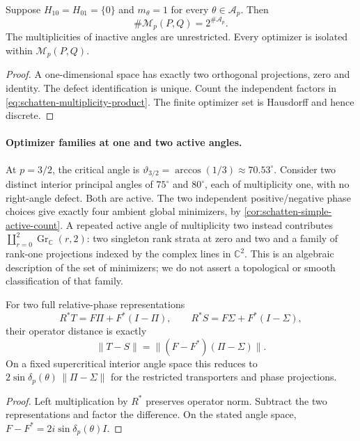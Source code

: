 \begin{corollary}
\label{cor:schatten-simple-active-count}
Suppose $H_{10}=H_{01}=\{0\}$ and $m_\theta=1$ for every
$\theta\in\mathcal A_p$. Then
\[
 \#\mathcal M_p(P,Q)=2^{\#\mathcal A_p}.
\]
The multiplicities of inactive angles are unrestricted.
Every optimizer is isolated within $\mathcal M_p(P,Q)$.
\end{corollary}

\begin{proof}
A one-dimensional space has exactly two orthogonal projections, zero and
identity. The defect identification is unique. Count the independent
factors in \cref{eq:schatten-multiplicity-product}.
The finite optimizer set is Hausdorff and hence discrete.
\end{proof}

\paragraph{Optimizer families at one and two active angles.}
At $p=3/2$, the critical angle is
$\vartheta_{3/2}=\arccos(1/3)\approx70.53^\circ$.
Consider two distinct interior principal angles of $75^\circ$ and
$80^\circ$, each of multiplicity one, with no right-angle defect.
Both are active. The two independent positive/negative phase choices
give exactly four ambient global minimizers, by
\cref{cor:schatten-simple-active-count}. A repeated active angle of
multiplicity two instead contributes
$\coprod_{r=0}^{2}\operatorname{Gr}_{\mathbb C}(r,2)$:
two singleton rank strata at zero and two and a family
of rank-one projections indexed by the complex lines in $\mathbb C^2$.
This is an algebraic description of the set of minimizers; we do not
assert a topological or smooth classification of that family.

\begin{corollary}
\label{cor:schatten-phase-parameter-distance}
For two full relative-phase representations
\[
 R^*T=F\Pi+F^*(I-\Pi),\qquad
 R^*S=F\Sigma+F^*(I-\Sigma),
\]
their operator distance is exactly
\[
 \|T-S\|=\|(F-F^*)(\Pi-\Sigma)\|.
\]
On a fixed supercritical interior angle space this reduces to
$2\sin\delta_p(\theta)\,\|\Pi-\Sigma\|$ for the restricted transporters
and phase projections.
\end{corollary}

\begin{proof}
Left multiplication by $R^*$ preserves operator norm. Subtract the two
representations and factor the difference. On the stated angle space,
$F-F^*=2i\sin\delta_p(\theta)I$.
\end{proof}

